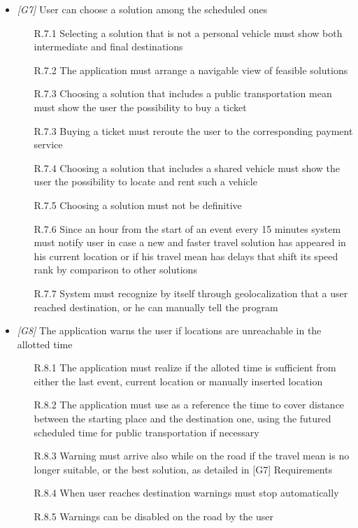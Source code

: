 \begin{itemize}
\item \textit{[G7]} User can choose a solution among the scheduled ones 

                   \begin{itemize}
                        \item [R.7.1] Selecting a solution that is not a personal vehicle must show both intermediate and final destinations
                        \item [R.7.2] The application must arrange a navigable view of feasible solutions
                        \item [R.7.3] Choosing a solution that includes a public transportation mean must show the user the possibility to buy a ticket 
                        \item [R.7.3] Buying a ticket must reroute the user to the corresponding payment service
                        \item [R.7.4] Choosing a solution that includes a shared vehicle must show the user the possibility to locate and rent such a vehicle
                        \item [R.7.5] Choosing a solution must not be definitive
                        \item [R.7.6] Since an hour from the start of an event every 15 minutes system must notify user in case a new and faster travel solution has appeared in his current location or if his travel mean has delays that shift its speed rank by comparison to other solutions
                        \item [R.7.7] System must recognize by itself through geolocalization that a user reached destination, or he can manually tell the program
                  \end{itemize}
                  
\item \textit{[G8]} The application warns the user if locations are unreachable in the allotted time

                   \begin{itemize}
                        \item[R.8.1] The application must realize if the alloted time is sufficient from either the last event, current location or manually inserted location
                        \item[R.8.2] The application must use as a reference the time to cover distance between the starting place and the destination one, using the futured scheduled time for public transportation if necessary
                   			\item [R.8.3] Warning must arrive also while on the road if the travel mean is no longer suitable, or the best solution, as detailed in [G7] Requirements
                   			\item [R.8.4] When user reaches destination warnings must stop automatically
                   			\item [R.8.5] Warnings can be disabled on the road by the user
                   \end{itemize}


\end{itemize}
